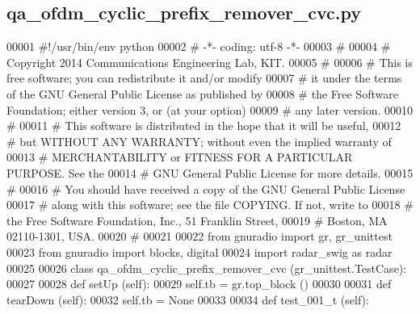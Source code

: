 \subsection{qa\+\_\+ofdm\+\_\+cyclic\+\_\+prefix\+\_\+remover\+\_\+cvc.\+py}
\label{qa__ofdm__cyclic__prefix__remover__cvc_8py_source}

\begin{DoxyCode}
00001 \textcolor{comment}{#!/usr/bin/env python}
00002 \textcolor{comment}{# -*- coding: utf-8 -*-}
00003 \textcolor{comment}{# }
00004 \textcolor{comment}{# Copyright 2014 Communications Engineering Lab, KIT.}
00005 \textcolor{comment}{# }
00006 \textcolor{comment}{# This is free software; you can redistribute it and/or modify}
00007 \textcolor{comment}{# it under the terms of the GNU General Public License as published by}
00008 \textcolor{comment}{# the Free Software Foundation; either version 3, or (at your option)}
00009 \textcolor{comment}{# any later version.}
00010 \textcolor{comment}{# }
00011 \textcolor{comment}{# This software is distributed in the hope that it will be useful,}
00012 \textcolor{comment}{# but WITHOUT ANY WARRANTY; without even the implied warranty of}
00013 \textcolor{comment}{# MERCHANTABILITY or FITNESS FOR A PARTICULAR PURPOSE.  See the}
00014 \textcolor{comment}{# GNU General Public License for more details.}
00015 \textcolor{comment}{# }
00016 \textcolor{comment}{# You should have received a copy of the GNU General Public License}
00017 \textcolor{comment}{# along with this software; see the file COPYING.  If not, write to}
00018 \textcolor{comment}{# the Free Software Foundation, Inc., 51 Franklin Street,}
00019 \textcolor{comment}{# Boston, MA 02110-1301, USA.}
00020 \textcolor{comment}{# }
00021 
00022 \textcolor{keyword}{from} gnuradio \textcolor{keyword}{import} gr, gr\_unittest
00023 \textcolor{keyword}{from} gnuradio \textcolor{keyword}{import} blocks, digital
00024 \textcolor{keyword}{import} radar\_swig \textcolor{keyword}{as} radar
00025 
00026 \textcolor{keyword}{class }qa_ofdm_cyclic_prefix_remover_cvc (gr\_unittest.TestCase):
00027 
00028     \textcolor{keyword}{def }setUp (self):
00029         self.tb = gr.top\_block ()
00030 
00031     \textcolor{keyword}{def }tearDown (self):
00032         self.tb = \textcolor{keywordtype}{None}
00033 
00034     \textcolor{keyword}{def }test_001_t (self):

\end{DoxyCode}
